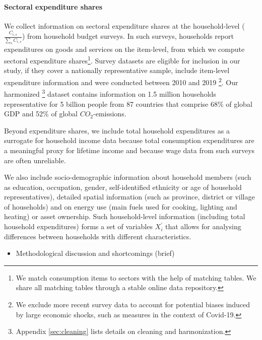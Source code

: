 \documentclass[12pt, a4paper]{article}
\begin{document}
\paragraph{Sectoral expenditure shares} We collect information on sectoral expenditure shares at the household-level ($\frac{C_{i,s}}{\sum_{s}C_{i,s}}$) from household budget surveys. In such surveys, households report expenditures on goods and services on the item-level, from which we compute sectoral expenditure shares\footnote{We match consumption items to sectors with the help of matching tables. We share all matching tables through a stable online data repository.}. Survey 
datasets are eligible for inclusion in our study, if they cover a nationally representative sample, include item-level expenditure information and were conducted between 2010 and 2019 \footnote{We exclude more recent survey data to account for potential biases induced by large economic shocks, such as measures in the context of Covid-19.}. Our harmonized \footnote{Appendix \ref{sec:cleaning} lists details on cleaning and harmonization.} dataset contains information on 1.5 million households representative for 5 billion people from 87 countries that comprise 68\% of global GDP and 52\% of global $CO_{2}$-emissions. 

Beyond expenditure shares, we include total household expenditures as a surrogate for household income data because total consumption expenditures are a meaningful proxy for lifetime income and because wage data from such surveys are often unreliable.

We also include socio-demographic information about household members (such as education, occupation, gender, self-identified ethnicity or age of household representatives), detailed spatial information (such as province, district or village of households) and on energy use (main fuels used for cooking, lighting and heating) or asset ownership. Such household-level information (including total household expenditures) forms a set of variables $X_{i}^{'}$ that allows for analysing differences between households with different characteristics.

\begin{itemize}
    \item Methodological discussion and shortcomings (brief)
\end{itemize}

\end{document}
